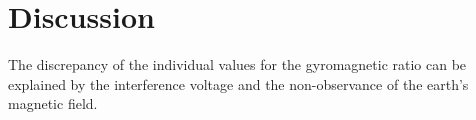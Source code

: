 \section{Discussion}
The discrepancy of the individual values for the gyromagnetic ratio can be explained by the interference
voltage and the non-observance of the earth's magnetic field.

